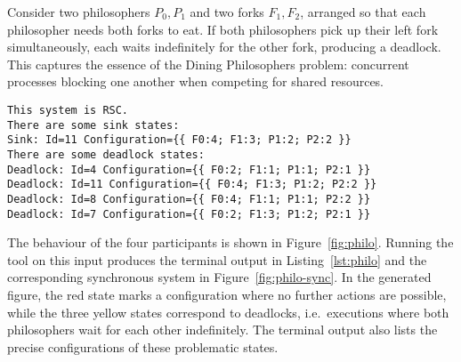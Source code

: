 \begin{example}\label{exm:philo}
Consider two philosophers $P_0, P_1$ and two forks $F_1, F_2$, arranged
so that each philosopher needs both forks to eat. If both philosophers
pick up their left fork simultaneously, each waits indefinitely for the
other fork, producing a deadlock. This captures the essence of the Dining
Philosophers problem: concurrent processes blocking one another when
competing for shared resources.

\bigskip

\begin{lstlisting}[language={},caption={Output of Example~\ref{exm:philo}},
    label={lst:philo}]
This system is RSC.
There are some sink states:
Sink: Id=11 Configuration={{ F0:4; F1:3; P1:2; P2:2 }}
There are some deadlock states:
Deadlock: Id=4 Configuration={{ F0:2; F1:1; P1:1; P2:1 }}
Deadlock: Id=11 Configuration={{ F0:4; F1:3; P1:2; P2:2 }}
Deadlock: Id=8 Configuration={{ F0:4; F1:1; P1:1; P2:2 }}
Deadlock: Id=7 Configuration={{ F0:2; F1:3; P1:2; P2:1 }}
\end{lstlisting}

The behaviour of the four participants is shown in
Figure~\ref{fig:philo}. Running the tool on
this input produces the terminal output in
Listing~\ref{lst:philo} and the corresponding synchronous system in
Figure~\ref{fig:philo-sync}. In the
generated figure, the red state marks a configuration where no further
actions are possible, while the three yellow states correspond to
deadlocks, i.e.\ executions where both philosophers wait for each other
indefinitely. The terminal output also lists the precise configurations
of these problematic states.

\newpage


\end{example}
